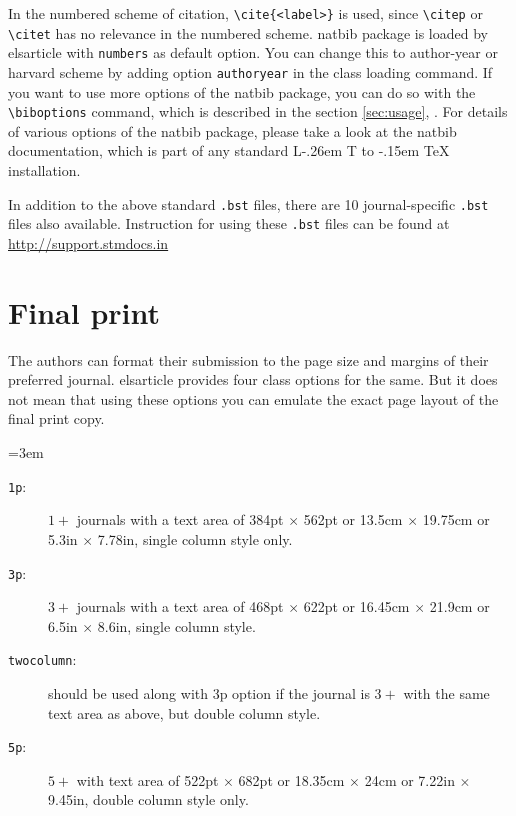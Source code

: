 \documentclass[a4paper,12pt]{article}
\makeatletter
\def\file#1{\textsf{#1}\xspace}
\DeclareRobustCommand{\LaTeX}{L\kern-.26em%
        {\sbox\z@ T%
         \vbox to\ht\z@{\hbox{\check@mathfonts
           \fontsize\sf@size\z@
           \math@fontsfalse\selectfont
          A\,}%
         \vss}%
        }%
     \kern-.15em%
    \TeX}
\makeatother
\begin{document}
In the numbered scheme of citation, \verb+\cite{<label>}+ is used,
since \verb+\citep+ or \verb+\citet+ has no relevance in the numbered
scheme.  \file{natbib} package is loaded by \file{elsarticle} with
\verb+numbers+ as default option.  You can change this to author-year
or harvard scheme by adding option \verb+authoryear+ in the class
loading command.  If you want to use more options of the \file{natbib}
package, you can do so with the \verb+\biboptions+ command, which is
described in the section \ref{sec:usage}, .  For
details of various options of the \file{natbib} package, please take a
look at the \file{natbib} documentation, which is part of any standard
\LaTeX{} installation.

In addition to the above standard \verb+.bst+ files, there are 10
journal-specific \verb+.bst+ files also available.
Instruction for using these \verb+.bst+ files can be found at 
\href{http://support.stmdocs.in/wiki/index.php?title=Model-wise_bibliographic_style_files}
{http://support.stmdocs.in}
 

\section{Final print}\label{sec:final}

The authors can format their submission to the page size and margins
of their preferred journal.  \file{elsarticle} provides four
class options for the same. But it does not mean that using these
options you can emulate the exact page layout of the final print copy. 


\lmrgn=3em
\begin{description}
\item [\texttt{1p}:] $1+$ journals with a text area of
384pt $\times$ 562pt or 13.5cm $\times$ 19.75cm or 5.3in $\times$
7.78in, single column style only.

\item [\texttt{3p}:] $3+$ journals with a text area of 468pt
$\times$ 622pt or 16.45cm $\times$ 21.9cm or 6.5in $\times$
8.6in, single column style.

\item [\texttt{twocolumn}:] should be used along with 3p option if the
journal is $3+$ with the same text area as above, but double column
style. 

\item [\texttt{5p}:] $5+$ with text area of 522pt $\times$
682pt or 18.35cm $\times$ 24cm or 7.22in $\times$ 9.45in,
double column style only.
\end{description}
\end{document}
